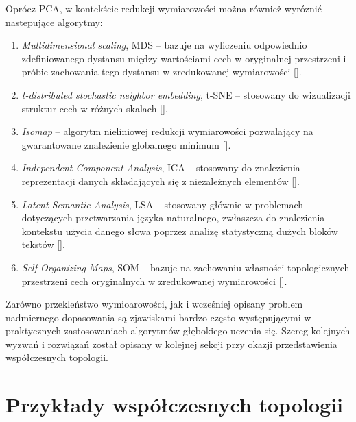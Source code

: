 Oprócz PCA, w kontekście redukcji wymiarowości można również wyróznić nastepujące algorytmy: 
\begin{enumerate}
	\item \textit{Multidimensional scaling}, MDS -- bazuje na wyliczeniu odpowiednio zdefiniowanego dystansu między wartościami cech w oryginalnej przestrzeni i próbie zachowania tego dystansu w zredukowanej wymiarowości [].
	\item \textit{t-distributed stochastic neighbor embedding}, t-SNE -- stosowany do wizualizacji struktur cech w różnych skalach [].
	\item \textit{Isomap} -- algorytm nieliniowej redukcji wymiarowości pozwalający na gwarantowane znalezienie globalnego minimum []. 
	\item \textit{Independent Component Analysis}, ICA -- stosowany do znalezienia reprezentacji danych składających się z niezależnych elementów [].
	\item \textit{Latent Semantic Analysis}, LSA -- stosowany głównie w problemach dotyczących przetwarzania języka naturalnego, zwłaszcza do znalezienia kontekstu użycia danego słowa poprzez analizę statystyczną dużych bloków tekstów []. 
	\item \textit{Self Organizing Maps}, SOM --  bazuje na zachowaniu własności topologicznych przestrzeni cech oryginalnych w zredukowanej wymiarowości [].
\end{enumerate}

Zarówno przekleństwo wymioarowości, jak i wcześniej opisany problem nadmiernego dopasowania są zjawiskami bardzo często występującymi w praktycznych zastosowaniach algorytmów głębokiego uczenia się. Szereg kolejnych wyzwań i rozwiązań został opisany w kolejnej sekcji przy okazji przedstawienia współczesnych topologii.

\section{Przykłady współczesnych topologii}

